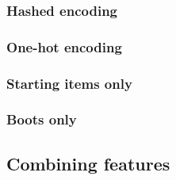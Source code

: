 \documentclass[Report.tex]{subfiles}
\begin{document}
\subsubsection{Hashed encoding}

\subsubsection{One-hot encoding}

\subsubsection{Starting items only}

\subsubsection{Boots only}


\subsection{Combining features}




\end{document}
